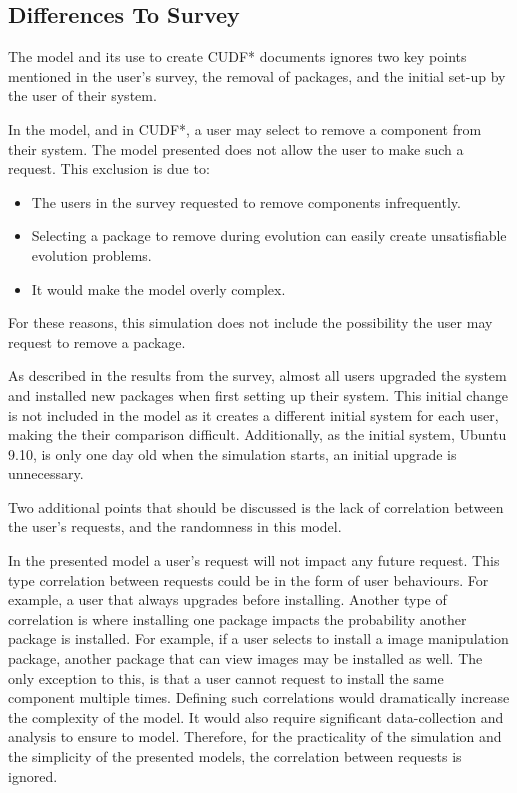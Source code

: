 \subsection{Differences To Survey}
The \usermodel model and its use to create CUDF* documents ignores two key points mentioned in the user's survey,
the removal of packages, and the initial set-up by the user of their system.

In the \modelname model, and in CUDF*, a user may select to remove a component from their system.
The \usermodel model presented does not allow the user to make such a request.
This exclusion is due to:
\begin{itemize}
  \item The users in the survey requested to remove components infrequently.
  \item Selecting a package to remove during evolution can easily create unsatisfiable evolution problems.
  \item It would make the \usermodel model overly complex. 
\end{itemize}
For these reasons, this simulation does not include the possibility the user may request to remove a package.

As described in the results from the survey, almost all users upgraded the system and installed new packages when first setting up their system.
This initial change is not included in the \usermodel model as it creates a different initial system for each user,
making the their comparison difficult.
Additionally, as the initial system, Ubuntu 9.10, is only one day old when the simulation starts, an initial upgrade is unnecessary.

Two additional points that should be discussed is the lack of correlation between the user's requests,
and the randomness in this model.

In the presented \usermodel model a user's request will not impact any future request.
This type correlation between requests could be in the form of user behaviours.
For example, a user that always upgrades before installing. 
Another type of correlation is where installing one package impacts the probability another package is installed.
For example, if a user selects to install a image manipulation package, another package that can view images may be installed as well.
The only exception to this, is that a user cannot request to install the same component multiple times.
Defining such correlations would dramatically increase the complexity of the \usermodel model.
It would also require significant data-collection and analysis to ensure to model.
Therefore, for the practicality of the simulation and the simplicity of the presented models, the correlation between requests is ignored.

